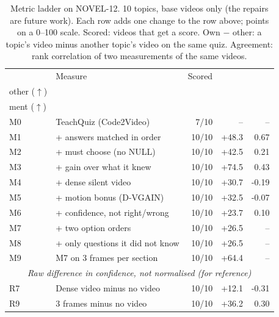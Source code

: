 \begin{table}[t]\centering\footnotesize
\caption{Metric ladder on NOVEL-12. 10 topics, base videos only (the repairs are future work). Each row adds one change to the row above; points on a 0--100 scale. Scored: videos that get a score. Own $-$ other: a topic's video minus another topic's video on the same quiz. Agreement: rank correlation of two measurements of the same videos.}\label{tab:ladder_novel}
\setlength{\tabcolsep}{4pt}\begin{tabular}{@{}llrrr@{}}\toprule & Measure & Scored & \hd{Own $-$\\other ($\uparrow$)} & \hd{Agree-\\ment ($\uparrow$)}\\\midrule
M0 & TeachQuiz (Code2Video) & 7/10 & -- & -- \\
M1 & + answers matched in order & 10/10 & +48.3 & 0.67 \\
M2 & + must choose (no NULL) & 10/10 & +42.5 & 0.21 \\
M3 & + gain over what it knew & 10/10 & +74.5 & 0.43 \\
M4 & + dense silent video & 10/10 & +30.7 & -0.19 \\
M5 & + motion bonus (D-VGAIN) & 10/10 & +32.5 & -0.07 \\
M6 & + confidence, not right/wrong & 10/10 & +23.7 & 0.10 \\
M7 & + two option orders & 10/10 & +26.5 & -- \\
M8 & + only questions it did not know & 10/10 & +26.5 & -- \\
M9 & M7 on 3 frames per section & 10/10 & +64.4 & -- \\
\midrule
\multicolumn{5}{c}{\textit{Raw difference in confidence, not normalised (for reference)}}\\
R7 & Dense video minus no video & 10/10 & +12.1 & -0.31 \\
R9 & 3 frames minus no video & 10/10 & +36.2 & 0.30 \\
\bottomrule\end{tabular}
\end{table}
